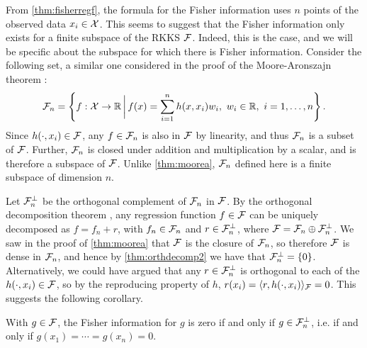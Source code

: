 From \cref{thm:fisherregf}, the formula for the Fisher information uses $n$ points of the observed data $x_i\in{\mathcal X}$.
This seems to suggest that the Fisher information only exists for a finite subspace of the RKKS ${\mathcal F}$.
Indeed, this is the case, and we will be specific about the subspace for which there is Fisher information.
Consider the following set, a similar one considered in the proof of the Moore-Aronszajn theorem :
\begin{align}\label{eq:subspaceFn}
{\mathcal F}_n = \left\{ f:{\mathcal X} \to \mathbb{R} \, \bigg| \, f(x) = \sum_{i=1}^n h(x,x_i)w_i, \ w_i \in \mathbb{R}, \ i=1,\dots,n \right\}.  
\end{align}
Since $h(\cdot,x_i) \in {\mathcal F}$, any $f \in {\mathcal F}_n$ is also in ${\mathcal F}$ by linearity, and thus ${\mathcal F}_n$ is a subset of ${\mathcal F}$.
Further, ${\mathcal F}_n$ is closed under addition and multiplication by a scalar, and is therefore a subspace of ${\mathcal F}$.
Unlike \cref{thm:moorea}, ${\mathcal F}_n$ defined here is a finite subspace of dimension $n$.

Let ${\mathcal F}_n^\bot$ be the orthogonal complement of ${\mathcal F}_n$ in ${\mathcal F}$.
By the orthogonal decomposition theorem , any regression function $f\in{\mathcal F}$ can be uniquely decomposed as $f = f_n + r$, with $f_n \in {\mathcal F}_n$ and $r \in {\mathcal F}_n^\bot$, where $\mathcal F = \mathcal F_n \oplus  {\mathcal F}_n^\bot$.
We saw in the proof of \cref{thm:moorea} that ${\mathcal F}$ is the closure of ${\mathcal F}_n$, so therefore ${\mathcal F}$ is dense in ${\mathcal F}_n$, and hence by \cref{thm:orthdecomp2}  we have that ${\mathcal F}_n^\bot = \{0\}$.
Alternatively, we could have argued that any $r \in {\mathcal F}_n^\bot$ is orthogonal to each of the $h(\cdot,x_i)\in{\mathcal F}$, so by the reproducing property of $h$, $r(x_i) = \langle r,h(\cdot,x_i)\rangle_{\mathcal F} = 0$.
This suggests the following corollary.

\begin{corollary}
  With $g \in {\mathcal F}$, the Fisher information for $g$ is zero if and only if $g\in{\mathcal F}_n^\bot$, i.e. if and only if $g(x_1) = \cdots = g(x_n) = 0$.
\end{corollary}

